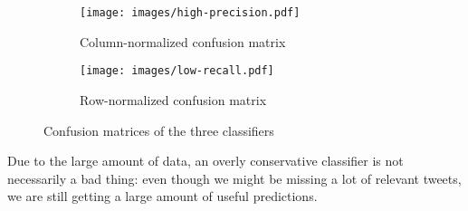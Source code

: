 \documentclass{llncs}
\begin{document}
\begin{figure}[H]
    \centering
    \begin{subfigure}[b]{0.48\textwidth}
        \texttt{[image: images/high-precision.pdf]}
        \caption{Column-normalized confusion matrix}
        \label{fig:column-confusion-matrix}
    \end{subfigure}
    \begin{subfigure}[b]{0.48\textwidth}
        \texttt{[image: images/low-recall.pdf]}
        \caption{Row-normalized confusion matrix}
        \label{fig:row-confusion-matrix}
    \end{subfigure}
    \caption{Confusion matrices of the three classifiers}
    \label{fig:confusion-matrix}
 \end{figure}
 
Due to the large amount of data, an overly conservative classifier is not necessarily a bad thing: even though we might be missing a lot of relevant tweets, we are still getting a large amount of useful predictions. 



\end{document}
